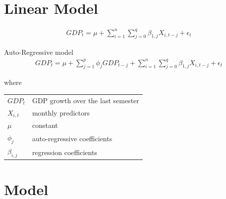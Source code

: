 \documentclass[12pt,a4paper,oneside]{book}
\begin{document}
\section{Linear Model}
\begin{eqnarray}
    GDP_{t} = \mu + \sum^n_{i = 1} \sum^q_{j = 0}
       \beta_{1,j} X_{i,t-j} + \epsilon_t 
\end{eqnarray}

Auto-Regressive model
\begin{eqnarray}
    GDP_{t} = \mu + \sum^p_{j = 1} \phi_j GDP_{t-j} +         \sum^n_{i = 1} \sum^q_{j = 0}
       \beta_{1,j} X_{i,t-j} + \epsilon_t 
\end{eqnarray}

where   \\
\begin{tabular}{l l}
    $GDP_t$     & GDP growth over the last semester \\
    $X_{i,t}$   & monthly predictors \\
    $\mu$       & constant \\
    $\phi_j$    & auto-regressive coefficients \\
    $\beta_{i,j}$ & regression coefficients \\
\end{tabular}



\section{Model}
\end{document}
